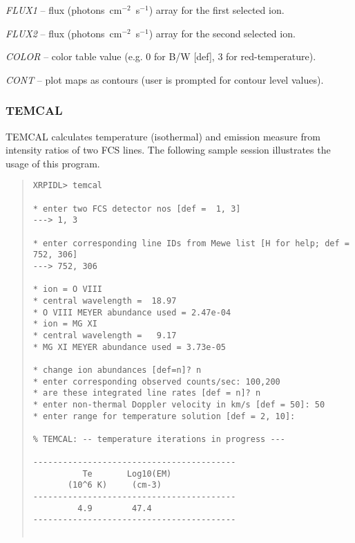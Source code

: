{{{{\it FLUX1} -- flux (photons~cm$^{-2}$~s$^{-1}$) array for the first selected
ion. 

{\it FLUX2} -- flux (photons~cm$^{-2}$~s$^{-1}$) array for the second selected
ion. 


{\it COLOR} -- color table value (e.g. 0 for B/W [def], 3 for red-temperature).

{\it CONT} -- plot maps as contours (user is prompted for contour level values).

\subsubsection{TEMCAL}

TEMCAL calculates temperature (isothermal) and emission measure from
intensity ratios of two FCS lines. The following sample session
illustrates the usage of this program. 
\begin{quote}
\begin{verbatim}
XRPIDL> temcal

* enter two FCS detector nos [def =  1, 3]
---> 1, 3

* enter corresponding line IDs from Mewe list [H for help; def = 752, 306]
---> 752, 306

* ion = O VIII
* central wavelength =  18.97
* O VIII MEYER abundance used = 2.47e-04
* ion = MG XI
* central wavelength =   9.17
* MG XI MEYER abundance used = 3.73e-05

* change ion abundances [def=n]? n
* enter corresponding observed counts/sec: 100,200
* are these integrated line rates [def = n]? n
* enter non-thermal Doppler velocity in km/s [def = 50]: 50
* enter range for temperature solution [def = 2, 10]:

% TEMCAL: -- temperature iterations in progress ---

-----------------------------------------
          Te       Log10(EM)
       (10^6 K)     (cm-3)
-----------------------------------------
         4.9        47.4
-----------------------------------------


\end{verbatim}
\end{quote}}}}
